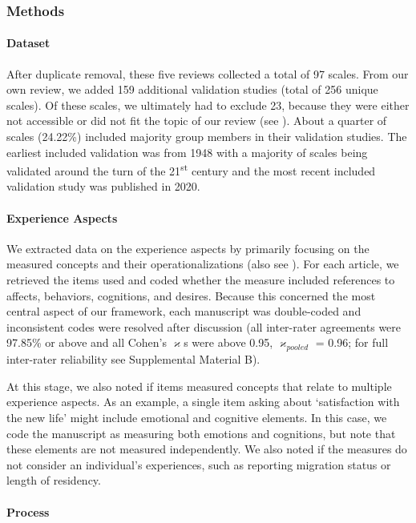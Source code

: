 \subsubsection{Methods}  
\paragraph{Dataset}

After duplicate removal, these five reviews collected a total of 97
scales. From our own review, we added 159 additional validation studies
(total of 256 unique scales). Of these scales, we ultimately had to
exclude 23, because they were either not accessible or did not fit the
topic of our review (see ). About a
quarter of scales (24.22\%) included majority group members in their
validation studies. The earliest included validation was from 1948 with
a majority of scales being validated around the turn of the
21\textsuperscript{st} century and the most recent included validation
study was published in 2020.

\paragraph{Experience Aspects}

We extracted data on the experience aspects by primarily focusing on the
measured concepts and their operationalizations (also see
). For each article, we retrieved the items
used and coded whether the measure included references to affects,
behaviors, cognitions, and desires. Because this concerned the most
central aspect of our framework, each manuscript was double-coded and
inconsistent codes were resolved after discussion (all inter-rater
agreements were 97.85\% or above and all Cohen's \(\varkappa\)s were
above 0.95, \(\varkappa_{pooled}\) = 0.96; for full inter-rater
reliability see Supplemental Material B).

At this stage, we also noted if items measured concepts that relate to
multiple experience aspects. As an example, a single item asking about
`satisfaction with the new life' might include emotional and cognitive
elements. In this case, we code the manuscript as measuring both
emotions and cognitions, but note that these elements are not measured
independently. We also noted if the measures do not consider an
individual's experiences, such as reporting migration status or length
of residency.

\paragraph{Process}

